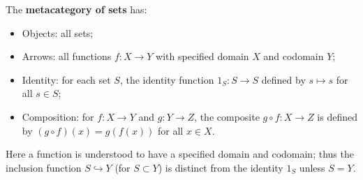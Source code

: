 The \textbf{metacategory of sets} has:
\begin{itemize}
\item Objects: all sets;
\item Arrows: all functions $f: X \rightarrow Y$ with specified domain $X$ and codomain $Y$;
\item Identity: for each set $S$, the identity function $1_S : S \rightarrow S$ defined by $s \mapsto s$ for all $s \in S$;
\item Composition: for $f: X \rightarrow Y$ and $g: Y \rightarrow Z$, the composite $g \circ f : X \rightarrow Z$ is defined by $(g \circ f)(x) = g(f(x))$ for all $x \in X$.
\end{itemize}
Here a function is understood to have a specified domain and codomain; thus the inclusion function $S \hookrightarrow Y$ (for $S \subset Y$) is distinct from the identity $1_S$ unless $S = Y$.
